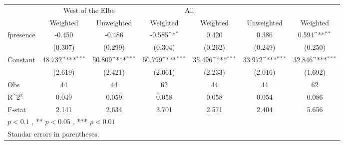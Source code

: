 {
\def\sym#1{\ifmmode^{#1}\else\(^{#1}\)\fi}
\begin{tabular}{@{\extracolsep{2pt}}l*{6}{c}@{}}
\hline\hline
& \multicolumn{2}{c}{West of the Elbe} & \multicolumn{2}{c}{All} \\
\cline{2-3-4}
\cline{5-6}
 & Weighted & Unweighted & Weighted & Weighted & Unweighted & Weighted \\
\hline
fpresence & -0.450 & -0.486 & -0.585\sym{*} & 0.420 & 0.386 & 0.594\sym{**} \\
 & (0.307) & (0.299) & (0.304) & (0.262) & (0.249) & (0.250) \\
Constant & 48.732\sym{***} & 50.809\sym{***} & 50.799\sym{***} & 35.496\sym{***} & 33.972\sym{***} & 32.846\sym{***} \\
 & (2.619) & (2.421) & (2.061) & (2.233) & (2.016) & (1.692) \\

\hline
Obs & 44 & 44 & 62 & 44 & 44 & 62 \\
R\sym{2} & 0.049 & 0.059 & 0.058 & 0.058 & 0.054 & 0.086 \\
F-stat & 2.141 & 2.634 & 3.701 & 2.571 & 2.404 & 5.656 \\
\hline\hline
\multicolumn{7}{l}{\footnotesize *$p < 0.1$ , ** $p < 0.05$ , *** $p < 0.01$} \\
\multicolumn{7}{l}{\footnotesize Standar errors in parentheses.} \\
\end{tabular}
}